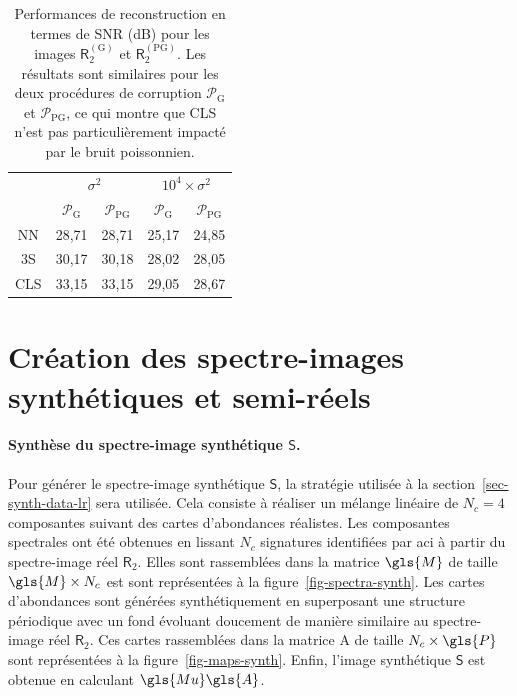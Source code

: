 \begin{table}[t]
    \centering
    \begin{tabular}{ccc|cc}
        \toprule
        & \multicolumn{2}{c|}{$\sigma^2$} & \multicolumn{2}{c}{$10^4\times\sigma^2$}\\
        & $\mathcal{P}_{\mathrm{G}}$ & $\mathcal{P}_{\mathrm{PG}}$ & $\mathcal{P}_{\mathrm{G}}$ & $\mathcal{P}_{\mathrm{PG}}$\\
        \midrule
        NN     & 28,71    & 28,71              & 25,17    & 24,85 \\
        3S     & 30,17    & 30,18              & 28,02    & 28,05 \\
        CLS    & 33,15    & 33,15              & 29,05    & 28,67 \\
        \bottomrule
    \end{tabular}
    \caption{Performances de reconstruction en termes de SNR (dB) pour les images $\mathsf{R}_2^{(\mathrm{G})}$ et $\mathsf{R}_2^{(\mathrm{PG})}$. Les résultats sont similaires pour les deux procédures de corruption $\mathcal{P}_{\mathrm{G}}$ et $\mathcal{P}_{\mathrm{PG}}$, ce qui montre que CLS n'est pas particulièrement impacté par le bruit poissonnien.
        \protect\label{table:SNR-poisson-gaussian}}
\end{table}


\section{Création des spectre-images synthétiques et semi-réels}\label{sec-spim-creation-hr}

\paragraph{Synthèse du spectre-image synthétique $\mathsf{S}$.} Pour générer le spectre-image synthétique $\mathsf{S}$, la stratégie utilisée à la section~\ref{sec-synth-data-lr} sera utilisée. Cela consiste à réaliser un mélange linéaire de $N_c=4$ composantes suivant des cartes d'abondances réalistes. Les composantes spectrales ont été obtenues en lissant $N_c$ signatures identifiées par \gls{aci} à partir du spectre-image réel $\mathsf{R}_2$. Elles sont rassemblées dans la matrice $\gls{M}$ de taille $\gls{M}\times N_c$ est sont représentées à la figure~\ref{fig-spectra-synth}. Les cartes d'abondances sont générées synthétiquement en superposant une structure périodique avec un fond évoluant doucement de manière similaire au spectre-image réel $\mathsf{R}_2$. Ces cartes rassemblées dans la matrice \gls{A} de taille $N_c\times\gls{P}$ sont représentées à la figure~\ref{fig-maps-synth}. Enfin, l'image synthétique $\mathsf{S}$ est obtenue en calculant $\gls{Mu}\gls{A}$.

